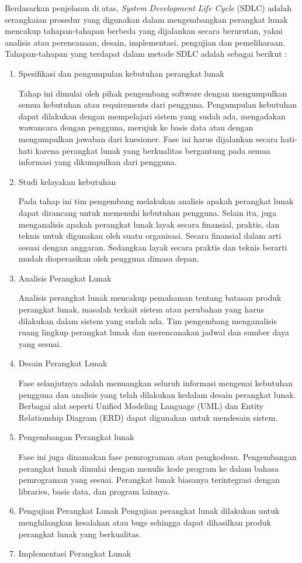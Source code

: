 Berdasarkan penjelasan di atas, \textit{System Development Life Cycle} (SDLC) adalah serangkaian prosedur yang digunakan dalam mengembangkan perangkat lunak mencakup tahapan-tahapan berbeda yang dijalankan secara berurutan, yakni analisis atau perencanaan, desain, implementasi, pengujian dan pemeliharaan. Tahapan-tahapan yang terdapat dalam metode SDLC adalah sebagai berikut \cite{Mohit} :
\begin{enumerate}
	\item Spesifikasi dan pengumpulan kebutuhan perangkat lunak
	
	Tahap ini dimulai oleh pihak pengembang software dengan mengumpulkan semua kebutuhan atau requirements dari pengguna. Pengumpulan kebutuhan dapat dilakukan dengan mempelajari sistem yang sudah ada, mengadakan wawancara dengan pengguna, merujuk ke basis data atau dengan mengumpulkan jawaban dari kuesioner. Fase ini harus dijalankan secara hati-hati karena perangkat lunak yang berkualitas bergantung pada semua informasi yang dikumpulkan dari pengguna. 
	\item Studi kelayakan kebutuhan
	
	Pada tahap ini tim pengembang melakukan analisis apakah perangkat lunak dapat dirancang untuk memenuhi kebutuhan pengguna. Selain itu, juga menganalisis apakah perangkat lunak layak secara finansial, praktis, dan teknis untuk digunakan oleh suatu organisasi. Secara finansial dalam arti sesuai dengan anggaran. Sedangkan layak secara praktis dan teknis berarti mudah dioperasikan oleh pengguna dimasa depan.
	\item Analisis Perangkat Lunak
	
	Analisis perangkat lunak mencakup pemahaman tentang batasan produk perangkat lunak, masalah terkait sistem atau perubahan yang harus dilakukan dalam sistem yang sudah ada. Tim pengembang menganalisis ruang lingkup perangkat lunak dan merencanakan jadwal dan sumber daya yang sesuai.
	\item Desain Perangkat Lunak
	
	Fase selanjutnya adalah menuangkan seluruh informasi mengenai kebutuhan pengguna dan analisis yang telah dilakukan kedalam desain perangkat lunak. Berbagai alat seperti Unified Modeling Language (UML) dan Entity Relationship Diagram (ERD) dapat digunakan untuk mendesain sistem. 
	\item Pengembangan Perangkat lunak
	
	Fase ini juga dinamakan fase pemrograman atau pengkodean. Pengembangan perangkat lunak dimulai dengan menulis kode program ke dalam bahasa pemrograman yang sesuai. Perangkat lunak biasanya terintegrasi dengan libraries, basis data, dan program lainnya. 
	\item Pengujian Perangkat Lunak
	Pengujian perangkat lunak dilakukan untuk menghilangkan kesalahan atau bugs sehingga dapat dihasilkan produk perangkat lunak yang berkualitas.
	\item Implementasi Perangkat Lunak
	

\end{enumerate}
